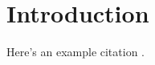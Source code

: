 \section{Introduction} \label{sec:introduction}



Here's an example citation \citep{faa2024complete}.
